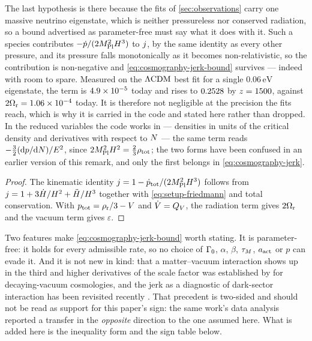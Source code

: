 \begin{remark}\label{rem:jerk-neutrinos}
  The last hypothesis is there because the fits of \cref{sec:observations}
  carry one massive neutrino eigenstate, which is neither pressureless nor
  conserved radiation, so a bound advertised as parameter-free must say what it
  does with it. Such a species contributes $-\dot p/(2M_{\mathrm{Pl}}^2H^3)$ to
  $j$, by the same identity as every other pressure, and its pressure falls
  monotonically as it becomes non-relativistic, so the contribution is
  non-negative and
  \cref{eq:cosmography-jerk-bound} survives --- indeed with room to spare.
  Measured on the $\Lambda\mathrm{CDM}$ best fit for a single $0.06\,\si{\electronvolt}$
  eigenstate, the term is $\num{4.9e-05}$ today and rises to
  $0.2528$ by $z=1500$,
  against $2\Omega_{\mathrm{r}}=\num{1.06e-04}$ today. It is therefore not
  negligible at the precision the fits reach, which is why it is carried in the
  code and stated here rather than dropped. In the reduced variables the code
  works in --- densities in units of the critical density and derivatives with
  respect to $N$ --- the same term reads $-\tfrac32(\mathrm{d} p/\mathrm{d} N)/E^2$,
  since $2M_{\mathrm{Pl}}^2H^2=\tfrac23\rho_{\rm tot}$; the two forms have been confused
  in an earlier version of this remark, and only the first belongs in
  \cref{eq:cosmography-jerk}.
\end{remark}

\begin{proof}
  The kinematic identity $j=1-\dot p_{\rm tot}/(2M_{\mathrm{Pl}}^2H^3)$ follows from
  $j=1+3\dot {H}/H^2+\ddot {H}/H^3$ together with
  \cref{eq:setup-friedmann} and total conservation. With
  $p_{\rm tot}=\rho_{\mathrm{r}}/3-V$ and $\dot {V}=Q_{V}$, the radiation term gives
  $2\Omega_{\mathrm{r}}$ and the vacuum term gives $\varepsilon$.
\end{proof}

Two features make \cref{eq:cosmography-jerk-bound} worth stating. It is
parameter-free: it holds for every admissible rate, so no choice of $\Gamma_{0}$,
$\alpha$, $\beta$, $\tau_{M}$, $a_{\mathrm{act}}$ or $p$ can evade it. And it is not
new in kind: that a matter--vacuum interaction shows up in the third and higher
derivatives of the scale factor was established by
\textcite{szydlowski2005_astro-ph0502034} for decaying-vacuum cosmologies, and
the jerk as a diagnostic of dark-sector interaction has been revisited recently
\parencite{worsley2026_260720348}. That precedent is two-sided and should not
be read as support for this paper's sign: the same work's data analysis
reported a transfer in the \emph{opposite} direction to the one assumed here.
What is added here is the inequality form and the sign table below.

